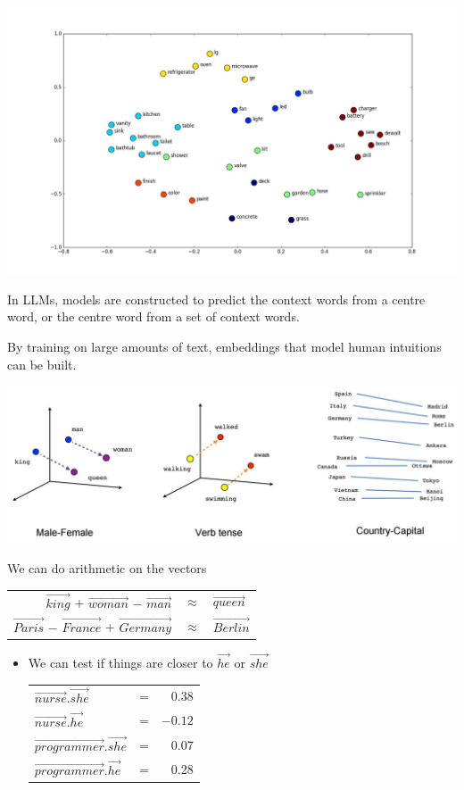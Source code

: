 \documentclass[25pt,a4paper,landscape,headrule,footrule,xetex]{foils}
\begin{document}
\hspace{-4em}\includegraphics[width=1.1\linewidth]{../pics/word-vector-space-similar-words.jpg}


In LLMs, models are constructed to predict the context words from a
centre word, or the centre word from a set of context words.

By training on large amounts of text, embeddings that model human
intuitions can be built.



\includegraphics[width=\linewidth]{../pics/vocabulary-linear-relationships.jpg}

We can do arithmetic on the vectors 


\begin{tabular}{rcl}
  $\vec{king}$ + $\vec{woman}$ $-$ $\vec{man}$  & $\approx$ & $\vec{queen}$ \\[2ex]
  $\vec{Paris}$ $-$ $\vec{France}$ + $\vec{Germany}$  & $\approx$ & $\vec{Berlin}$
\end{tabular}




\begin{itemize}
\item We can test if things are closer to $\vec{he}$ or $\vec{she}$
  \\[2ex]
  \begin{tabular}{lcr}
    $\vec{nurse}.\vec{she}$ & = & 0.38 \\
    $\vec{nurse}.\vec{he}$ & = & $-0.12$ \\
    $\vec{programmer}.\vec{she}$ & = & 0.07 \\
    $\vec{programmer}.\vec{he}$ & = & 0.28 \\
  \end{tabular}
\end{itemize}
\end{document}
